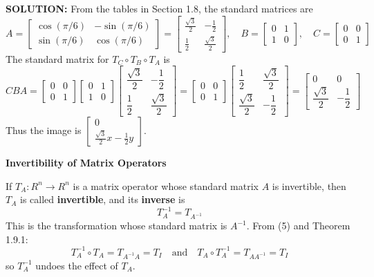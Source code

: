 \documentclass{article}
\newcommand{\redheading}[1]{{\vspace{2mm}\noindent\Large\bfseries\color{red!55!black} #1\par}\vspace{2mm}}
\theoremstyle{mystyle}
\begin{document}
\textbf{SOLUTION:} From the tables in Section 1.8, the standard matrices are
\[
A=\begin{bmatrix}\cos(\pi/6)&-\sin(\pi/6)\\\sin(\pi/6)&\cos(\pi/6)\end{bmatrix}=\begin{bmatrix}\frac{\sqrt3}{2}&-\frac12\\\frac12&\frac{\sqrt3}{2}\end{bmatrix},\quad
B=\begin{bmatrix}0&1\\1&0\end{bmatrix},\quad
C=\begin{bmatrix}0&0\\0&1\end{bmatrix}
\]
The standard matrix for $T_C\circ T_B\circ T_A$ is
\[
CBA=\begin{bmatrix}0&0\\0&1\end{bmatrix}\begin{bmatrix}0&1\\1&0\end{bmatrix}\begin{bmatrix}\dfrac{\sqrt3}{2}&-\dfrac12\\[4pt]\dfrac12&\dfrac{\sqrt3}{2}\end{bmatrix}
=\begin{bmatrix}0&0\\0&1\end{bmatrix}\begin{bmatrix}\dfrac12&\dfrac{\sqrt3}{2}\\[4pt]\dfrac{\sqrt3}{2}&-\dfrac12\end{bmatrix}
=\begin{bmatrix}0&0\\\dfrac{\sqrt3}{2}&-\dfrac12\end{bmatrix}
\]
Thus the image is $\begin{bmatrix}0\\\frac{\sqrt3}{2}x-\frac12y\end{bmatrix}$.

\redheading{Invertibility of Matrix Operators}

If $T_A:R^n\to R^n$ is a matrix operator whose standard matrix $A$ is invertible, then $T_A$ is called \textbf{invertible}, and its \textbf{inverse} is
\[
T_A^{-1}=T_{A^{-1}} \tag{5}
\]
This is the transformation whose standard matrix is $A^{-1}$. From (5) and Theorem 1.9.1:
\[
T_A^{-1}\circ T_A=T_{A^{-1}A}=T_I \quad\text{and}\quad T_A\circ T_A^{-1}=T_{AA^{-1}}=T_I
\]
so $T_A^{-1}$ undoes the effect of $T_A$.
\end{document}
